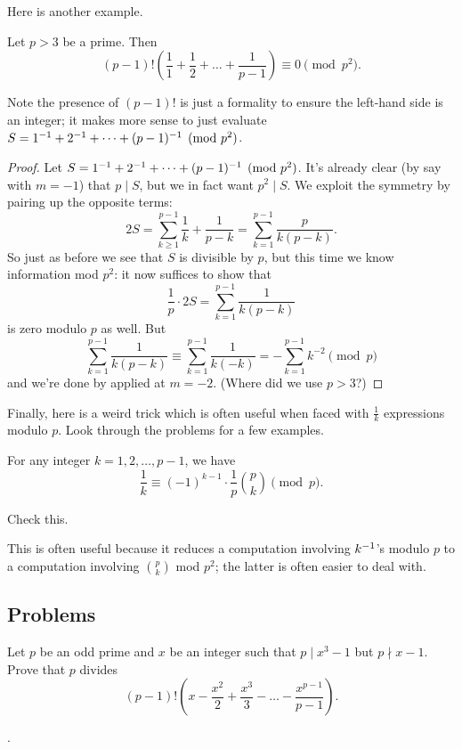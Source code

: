 \documentclass[11pt]{scrartcl}
\begin{document}
Here is another example.
\begin{example}
  Let $p > 3$ be a prime.
  Then
  \[ (p-1)!\left( \frac11 + \frac12 + \dots + \frac1{p-1} \right) \equiv 0 \pmod{p^2}. \]
\end{example}
Note the presence of $(p-1)!$ is just a formality to ensure
the left-hand side is an integer; it makes more sense
to just evaluate $S = 1^{-1} + 2^{-1} + \dots + (p-1)^{-1} \pmod{p^2}$.
\begin{proof}
  Let $S = 1^{-1} + 2^{-1} + \dots + (p-1)^{-1} \pmod{p^2}$.
  It's already clear (by say  with $m = -1$)
  that $p \mid S$, but we in fact want $p^2 \mid S$.
  We exploit the symmetry by pairing up the opposite terms:
  \[
    2S = \sum_{k \ge 1}^{p-1} \frac{1}{k} + \frac{1}{p-k}
    = \sum_{k=1}^{p-1} \frac{p}{k(p-k)}.
  \]
  So just as before we see that $S$ is divisible by $p$,
  but this time we know information mod $p^2$: it now suffices to show that
  \[ \frac{1}{p} \cdot 2S = \sum_{k=1}^{p-1} \frac{1}{k(p-k)} \]
  is zero modulo $p$ as well.
  But
  \[
    \sum_{k=1}^{p-1} \frac{1}{k(p-k)}
    \equiv \sum_{k=1}^{p-1} \frac{1}{k(-k)}
    = -\sum_{k=1}^{p-1} k^{-2}
    \pmod p
  \]
  and we're done by  applied at $m=-2$.
  (Where did we use $p > 3$?)
\end{proof}

Finally, here is a weird trick which is often useful when
faced with $\frac1k$ expressions modulo $p$.
Look through the problems for a few examples.
\begin{lemma}
  \label{lem:harmonic_p_trick}
  For any integer $k = 1, 2, \dots, p-1$, we have
  \[ \frac{1}{k} \equiv (-1)^{k-1} \cdot \frac1p \binom pk \pmod p. \]
\end{lemma}
\begin{exercise}
  Check this.
\end{exercise}

This is often useful because it reduces a computation
involving $k^{-1}$'s modulo $p$ to a computation
involving $\binom pk$ mod $p^2$;
the latter is often easier to deal with.

\subsection{Problems}
\begin{problem} %
  [ELMO 2009, John Berman]
  Let $p$ be an odd prime and $x$ be an integer
  such that $p \mid x^3 - 1$ but $p \nmid x - 1$.
  Prove that $p$ divides
  \[ (p-1)!
    \left( x - \frac{x^2}{2} + \frac{x^3}{3} - \dots - \frac{x^{p-1}}{p-1} \right).
  \]
  \begin{hint}
    .
  \end{hint}
\end{problem}
\end{document}
